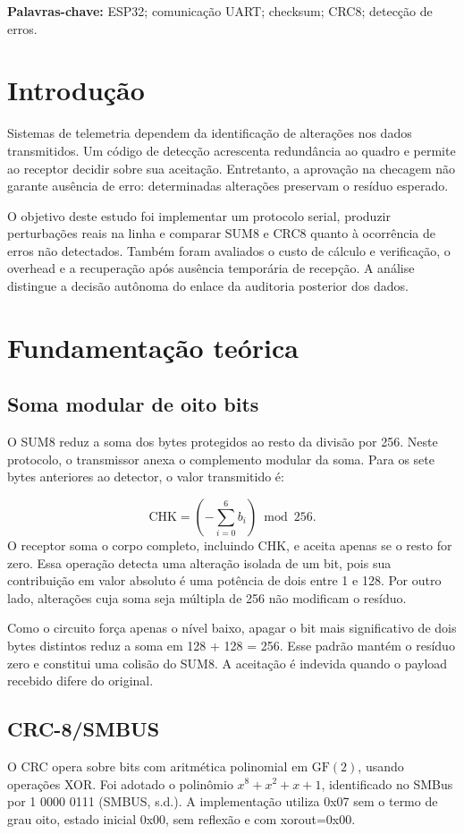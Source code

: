 \documentclass[12pt,a4paper]{article}
\begin{document}
\textbf{Palavras-chave:} ESP32; comunicação UART; checksum; CRC8; detecção de erros.

\clearpage\tableofcontents\clearpage{}
\section{Introdução}
Sistemas de telemetria dependem da identificação de alterações nos dados transmitidos. Um código de detecção acrescenta redundância ao quadro e permite ao receptor decidir sobre sua aceitação. Entretanto, a aprovação na checagem não garante ausência de erro: determinadas alterações preservam o resíduo esperado.

O objetivo deste estudo foi implementar um protocolo serial, produzir perturbações reais na linha e comparar SUM8 e CRC8 quanto à ocorrência de erros não detectados. Também foram avaliados o custo de cálculo e verificação, o overhead e a recuperação após ausência temporária de recepção. A análise distingue a decisão autônoma do enlace da auditoria posterior dos dados.

\FloatBarrier
\section{Fundamentação teórica}
\subsection{Soma modular de oito bits}
O SUM8 reduz a soma dos bytes protegidos ao resto da divisão por 256. Neste protocolo, o transmissor anexa o complemento modular da soma. Para os sete bytes anteriores ao detector, o valor transmitido é:

\begin{equation}\mathrm{CHK}=\left(-\sum_{i=0}^{6}b_i\right)\bmod256.\end{equation}
O receptor soma o corpo completo, incluindo CHK, e aceita apenas se o resto for zero. Essa operação detecta uma alteração isolada de um bit, pois sua contribuição em valor absoluto é uma potência de dois entre 1 e 128. Por outro lado, alterações cuja soma seja múltipla de 256 não modificam o resíduo.

Como o circuito força apenas o nível baixo, apagar o bit mais significativo de dois bytes distintos reduz a soma em 128 + 128 = 256. Esse padrão mantém o resíduo zero e constitui uma colisão do SUM8. A aceitação é indevida quando o payload recebido difere do original.

\subsection{CRC-8/SMBUS}
O CRC opera sobre bits com aritmética polinomial em \(\mathrm{GF}(2)\), usando operações XOR. Foi adotado o polinômio \(x^{8}+x^{2}+x+1\), identificado no SMBus por 1 0000 0111 (SMBUS, s.d.). A implementação utiliza 0x07 sem o termo de grau oito, estado inicial 0x00, sem reflexão e com xorout=0x00.
\end{document}
